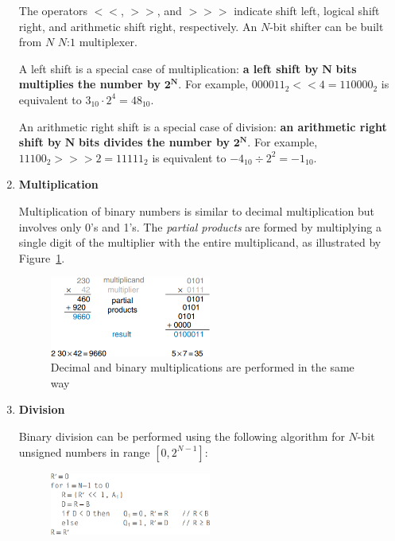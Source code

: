 \documentclass[12pt]{article}
\numberwithin{figure}{subsection}
\numberwithin{table}{subsection}
\numberwithin{equation}{subsection}
\begin{document}
\begin{enumerate}
  The operators $<<$, $>>$, and $>>>$ indicate shift left, logical shift right, and arithmetic shift right, respectively. An $N$-bit shifter can be built from $N$ $N\text{:}1$ multiplexer.

  A left shift is a special case of multiplication: \textbf{a left shift by} $\mathbf{N}$ \textbf{bits multiplies the number by} $\mathbf{2^N}$. For example, $000011_2 << 4 = 110000_2$ is equivalent to $3_{10} \cdot 2^4 = 48_{10}$.

  An arithmetic right shift is a special case of division: \textbf{an arithmetic right shift by} $\mathbf{N}$ \textbf{bits divides the number by} $\mathbf{2^N}$. For example, $11100_2 >>> 2 = 11111_2$ is equivalent to $-4_{10} \div 2^2 = -1_{10}$.

  \item \textbf{Multiplication}

  Multiplication of binary numbers is similar to decimal multiplication but involves only 0's and 1's. The \textit{partial products} are formed by multiplying a single digit of the multiplier with the entire multiplicand, as illustrated by Figure~\ref{fig:decimal_vs_binary_multiplication}.

  \newpage

  \begin{figure}[ht]
    \centering
    \includegraphics[width=0.5\textwidth]{decimal_vs_binary_multiplication.png}
    \caption{Decimal and binary multiplications are performed in the same way}
    \label{fig:decimal_vs_binary_multiplication}
  \end{figure}

  \item \textbf{Division}

  Binary division can be performed using the following algorithm for $N$-bit unsigned numbers in range $\left[ 0, 2^{N - 1} \right]$:

  \begin{figure}[ht]
    \centering
    \includegraphics[width=0.5\textwidth]{division_algorithm.png}
  \end{figure}


\end{enumerate}
\end{document}

